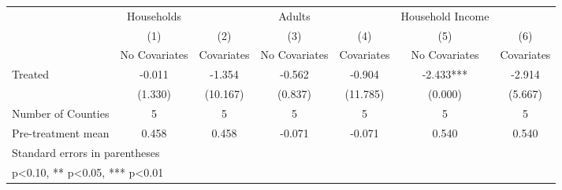 {
\def\sym#1{\ifmmode^{#1}\else\(^{#1}\)\fi}
\begin{tabular}{l*{6}{c}}
\hline\hline
            &  Households   &               &      Adults   &               &Household Income   &               \\
            &\multicolumn{1}{c}{(1)}&\multicolumn{1}{c}{(2)}&\multicolumn{1}{c}{(3)}&\multicolumn{1}{c}{(4)}&\multicolumn{1}{c}{(5)}&\multicolumn{1}{c}{(6)}\\
            &\multicolumn{1}{c}{No Covariates}&\multicolumn{1}{c}{Covariates}&\multicolumn{1}{c}{No Covariates}&\multicolumn{1}{c}{Covariates}&\multicolumn{1}{c}{No Covariates}&\multicolumn{1}{c}{Covariates}\\
\hline
Treated     &      -0.011   &      -1.354   &      -0.562   &      -0.904   &      -2.433***&      -2.914   \\
            &     (1.330)   &    (10.167)   &     (0.837)   &    (11.785)   &     (0.000)   &     (5.667)   \\
\hline
Number of Counties&           5   &           5   &           5   &           5   &           5   &           5   \\
Pre-treatment mean&       0.458   &       0.458   &      -0.071   &      -0.071   &       0.540   &       0.540   \\
\hline\hline
\multicolumn{7}{l}{\footnotesize Standard errors in parentheses}\\
\multicolumn{7}{l}{\footnotesize * p<0.10, ** p<0.05, *** p<0.01}\\
\end{tabular}
}
